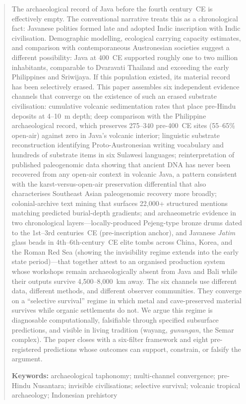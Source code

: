\documentclass[12pt,a4paper]{article}
\begin{document}
\begin{abstract}
The archaeological record of Java before the fourth century~CE is effectively empty. The conventional narrative treats this as a chronological fact: Javanese polities formed late and adopted Indic inscription with Indic civilisation. Demographic modelling, ecological carrying capacity estimates, and comparison with contemporaneous Austronesian societies suggest a different possibility: Java at 400~CE supported roughly one to two million inhabitants, comparable to Dvaravati Thailand and exceeding the early Philippines and Sriwijaya. If this population existed, its material record has been selectively erased. This paper assembles six independent evidence channels that converge on the existence of such an erased substrate civilisation: cumulative volcanic sedimentation rates that place pre-Hindu deposits at 4--10~m depth; deep comparison with the Philippine archaeological record, which preserves 275--340 pre-400~CE sites (55--65\% open-air) against zero in Java's volcanic interior; linguistic substrate reconstruction identifying Proto-Austronesian writing vocabulary and hundreds of substrate items in six Sulawesi languages; reinterpretation of published paleogenomic data showing that ancient DNA has never been recovered from any open-air context in volcanic Java, a pattern consistent with the karst-versus-open-air preservation differential that also characterises Southeast Asian paleogenomic recovery more broadly; colonial-archive text mining that surfaces 22{,}000+ structured mentions matching predicted burial-depth gradients; and archaeometric evidence in two chronological layers---locally-produced Pejeng-type bronze drums dated to the 1st--3rd centuries~CE (pre-inscription anchor), and Javanese \textit{Jatim} glass beads in 4th--6th-century~CE elite tombs across China, Korea, and the Roman Red Sea (showing the invisibility regime extends into the early state period)---that together attest to an organised production system whose workshops remain archaeologically absent from Java and Bali while their outputs survive 4{,}500--8{,}000~km away. The six channels use different data, different methods, and different observer communities. They converge on a ``selective survival'' regime in which metal and cave-preserved material survives while organic settlements do not. We argue this regime is diagnosable computationally, falsifiable through specified subsurface predictions, and visible in living tradition (wayang, \textit{gunungan}, the Semar complex). The paper closes with a six-filter framework and eight pre-registered predictions whose outcomes can support, constrain, or falsify the argument.

\medskip
\noindent\textbf{Keywords:} archaeological taphonomy; multi-channel convergence; pre-Hindu Nusantara; invisible civilisations; selective survival; volcanic tropical archaeology; Indonesian prehistory
\end{abstract}
\end{document}
